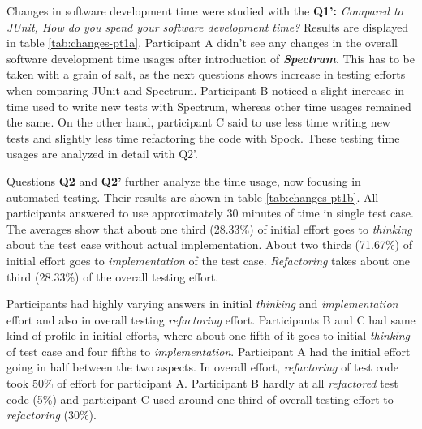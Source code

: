 Changes in software development time were studied with the \textbf{Q1':} \textit{Compared to JUnit, How do you spend your
software development time?} Results are displayed in table \ref{tab:changes-pt1a}. Participant A
didn't see any changes in the overall software development time usages after introduction of \textbf{\textit{Spectrum}}. This has to be taken
with a grain of salt, as the  next questions shows increase in testing efforts when comparing JUnit and Spectrum.
Participant B noticed a slight increase in time used to write new tests with Spectrum, whereas other time usages remained
the same. On the other hand, participant C said to use less time writing new tests and slightly less time refactoring the code with Spock.
These testing time usages are analyzed in detail with Q2'.

Questions \textbf{Q2} and \textbf{Q2'} further analyze the time usage, now focusing in automated testing. Their results are
shown in table \ref{tab:changes-pt1b}. All participants answered to use approximately 30 minutes of time in single test case. The
averages show that about one third (28.33\%) of initial effort goes to \textit{thinking} about the test case without actual implementation.
About two thirds (71.67\%) of initial effort goes to \textit{implementation} of the test case. \textit{Refactoring} takes about one third (28.33\%)
of the overall testing effort.

Participants had highly varying answers in initial \textit{thinking} and \textit{implementation} effort and also
in overall testing \textit{refactoring} effort. Participants B and C had same kind of profile
in initial efforts, where about one fifth of it goes to initial \textit{thinking} of test case and four fifths to \textit{implementation}.
Participant A had the initial effort going in half between the two aspects. In overall effort,
\textit{refactoring} of test code took 50\% of effort for participant A. Participant B
hardly at all \textit{refactored} test code (5\%) and participant C used around one third of overall testing effort
to \textit{refactoring} (30\%).



